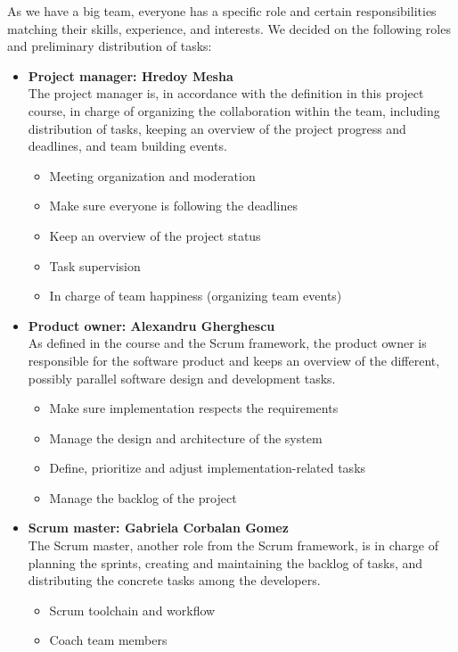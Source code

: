 As we have a big team, everyone has a specific role and certain responsibilities matching their skills, experience, and interests. We decided on the following roles and preliminary distribution of tasks:

\begin{itemize}
	\item \textbf{Project manager: Hredoy Mesha} \\
		The project manager is, in accordance with the definition in this project course, in charge of organizing the collaboration within the team, including distribution of tasks, keeping an overview of the project progress and deadlines, and team building events.
		\begin{itemize}
			\item Meeting organization and moderation
			\item Make sure everyone is following the deadlines
			\item Keep an overview of the project status
			\item Task supervision
			\item In charge of team happiness (organizing team events)
		\end{itemize}
	\item \textbf{Product owner: Alexandru Gherghescu} \\
		As defined in the course and the Scrum framework, the product owner is responsible for the software product and keeps an overview of the different, possibly parallel software design and development tasks.
		\begin{itemize}
			\item Make sure implementation respects the requirements
			\item Manage the design and architecture of the system
			\item Define, prioritize and adjust implementation-related tasks
			\item Manage the backlog of the project
		\end{itemize}
	\item \textbf{Scrum master: Gabriela Corbalan Gomez} \\
		The Scrum master, another role from the Scrum framework, is in charge of planning the sprints, creating and maintaining the backlog of tasks, and distributing the concrete tasks among the developers.
		\begin{itemize}
			\item Scrum toolchain and workflow
			\item Coach team members

\end{itemize}
\end{itemize}
